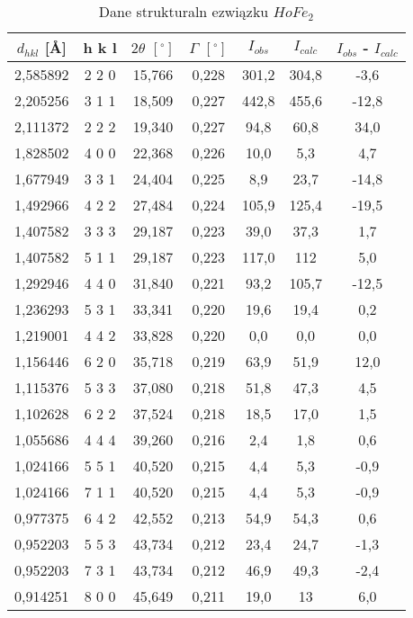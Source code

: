 \documentclass[a4paper,12pt]{article}
\numberwithin{equation}{section}
\begin{document}
\begin{appendices}
  \label{HoRentgenTab}
  \scriptsize
  \begin{longtable}[c]{|c|c|c|c|c|c|c|}
\caption{Dane strukturaln ezwiązku $HoFe_2$}\\
  \hline
    $d_{hkl}$ [\AA]&	h	k	l&$2\theta$ $\left[ ^{\circ}\right]$&$\Gamma$ $\left[ ^{\circ}\right]$&$I_{obs}$&$I_{calc}$	&$I_{obs}$ - $I_{calc}$	\\\hline\hline
2,585892	&	2   2   0	&	15,766	&	0,228	&	301,2	&	304,8	&	-3,6	\\\hline
2,205256	&	3   1   1	&	18,509	&	0,227	&	442,8	&	455,6	&	-12,8	\\\hline
2,111372	&	2   2   2	&	19,340	&	0,227	&	94,8	&	60,8	&	34,0	\\\hline
1,828502	&	4   0   0	&	22,368	&	0,226	&	10,0	&	5,3	&	4,7	\\\hline
1,677949	&	3   3   1	&	24,404	&	0,225	&	8,9	&	23,7	&	-14,8	\\\hline
1,492966	&	4   2   2	&	27,484	&	0,224	&	105,9	&	125,4	&	-19,5	\\\hline
1,407582	&	3   3   3	&	29,187	&	0,223	&	39,0	&	37,3	&	1,7	\\\hline
1,407582	&	5   1   1	&	29,187	&	0,223	&	117,0	&	112	&	5,0	\\\hline
1,292946	&	4   4   0	&	31,840	&	0,221	&	93,2	&	105,7	&	-12,5	\\\hline
1,236293	&	5   3   1	&	33,341	&	0,220	&	19,6	&	19,4	&	0,2	\\\hline
1,219001	&	4   4   2	&	33,828	&	0,220	&	0,0	&	0,0	&	0,0	\\\hline
1,156446	&	6   2   0	&	35,718	&	0,219	&	63,9	&	51,9	&	12,0	\\\hline
1,115376	&	5   3   3	&	37,080	&	0,218	&	51,8	&	47,3	&	4,5	\\\hline
1,102628	&	6   2   2	&	37,524	&	0,218	&	18,5	&	17,0	&	1,5	\\\hline
1,055686	&	4   4   4	&	39,260	&	0,216	&	2,4	&	1,8	&	0,6	\\\hline
1,024166	&	5   5   1	&	40,520	&	0,215	&	4,4	&	5,3	&	-0,9	\\\hline
1,024166	&	7   1   1	&	40,520	&	0,215	&	4,4	&	5,3	&	-0,9	\\\hline
0,977375	&	6   4   2	&	42,552	&	0,213	&	54,9	&	54,3	&	0,6	\\\hline
0,952203	&	5   5   3	&	43,734	&	0,212	&	23,4	&	24,7	&	-1,3	\\\hline
0,952203	&	7   3   1	&	43,734	&	0,212	&	46,9	&	49,3	&	-2,4	\\\hline
0,914251	&	8   0   0	&	45,649	&	0,211	&	19,0	&	13	&	6,0	\\\hline

\end{longtable}
\end{appendices}
\end{document}
